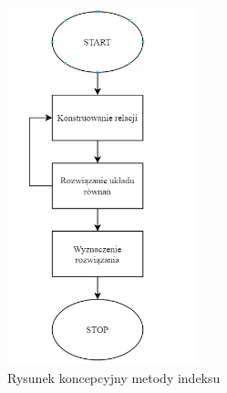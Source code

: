 \documentclass[]{article}
\begin{document}
	\begin{figure}[H]
		\begin{center}
			\includegraphics[width=5.5cm]{./img/schemat_1.png}
			\caption{Rysunek koncepcyjny metody indeksu}
		\end{center}
	\end{figure}
\end{document}
